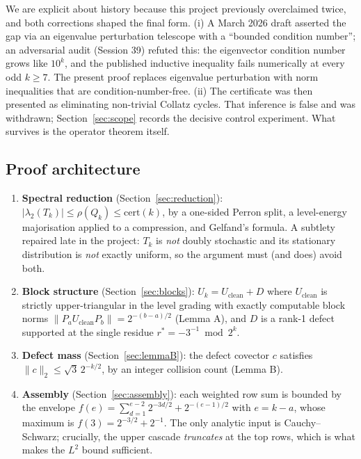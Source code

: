 \documentclass[12pt,a4paper]{article}
\newcommand{\cert}{\mathrm{cert}}
\begin{document}
\label{sec:intro-history}%
We are explicit about history because this project previously overclaimed twice, and both
corrections shaped the final form. (i) A March 2026 draft asserted the gap via an eigenvalue
perturbation telescope with a ``bounded condition number''; an adversarial audit (Session 39)
refuted this: the eigenvector condition number grows like $10^k$, and the published inductive
inequality fails numerically at every odd $k \geq 7$. The present proof replaces eigenvalue
perturbation with norm inequalities that are condition-number-free. (ii) The certificate was
then presented as eliminating non-trivial Collatz cycles. That inference is false and was
withdrawn; Section~\ref{sec:scope} records the decisive control experiment. What survives is the
operator theorem itself.

\subsection*{Proof architecture}

\begin{enumerate}
\item \textbf{Spectral reduction} (Section~\ref{sec:reduction}): $|\lambda_2(T_k)| \le \rho(Q_k)
  \le \cert(k)$, by a one-sided Perron split, a level-energy majorisation applied to a
  compression, and Gelfand's formula. A subtlety repaired late in the project: $T_k$ is
  \emph{not} doubly stochastic and its stationary distribution is \emph{not} exactly uniform,
  so the argument must (and does) avoid both.
\item \textbf{Block structure} (Section~\ref{sec:blocks}): $U_k = U_{\mathrm{clean}} + D$ where
  $U_{\mathrm{clean}}$ is strictly upper-triangular in the level grading with exactly computable
  block norms $\|P_a U_{\mathrm{clean}} P_b\| = 2^{-(b-a)/2}$ (Lemma A), and $D$ is a rank-1
  defect supported at the single residue $r^\ast = -3^{-1} \bmod 2^k$.
\item \textbf{Defect mass} (Section~\ref{sec:lemmaB}): the defect covector $c$ satisfies
  $\|c\|_2 \le \sqrt{3}\,2^{-k/2}$, by an integer collision count (Lemma B).
\item \textbf{Assembly} (Section~\ref{sec:assembly}): each weighted row sum is bounded by the
  envelope $f(e) = \sum_{d=1}^{e-2} 2^{-3d/2} + 2^{-(e-1)/2}$ with $e = k - a$, whose maximum is
  $f(3) = 2^{-3/2} + 2^{-1}$. The only analytic input is Cauchy--Schwarz; crucially, the upper
  cascade \emph{truncates} at the top rows, which is what makes the $L^2$ bound sufficient.
\end{enumerate}
\end{document}
